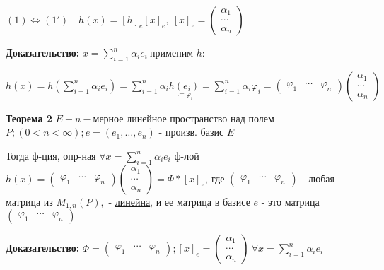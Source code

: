 $(1) \Leftrightarrow (1') \quad h(x) = [h]_e [x]_e,\ [x]_e = \begin{pmatrix} \alpha_1  \\ \cdots \\ \alpha_n \end{pmatrix}$

\textbf{Доказательство: } $x = \sum\limits_{i=1}^n \alpha_i e_i \ $применим $h:$

$h(x) = h\left( \sum\limits_{i=1}^n \alpha_i e_i \right) = \sum\limits_{i=1}^n \alpha_i \underset{:=\varphi_i}{h(e_i)} = \sum\limits_{i=1}^n \alpha_i \varphi_i = \begin{pmatrix} \varphi_1 & \cdots & \varphi_n \end{pmatrix} \begin{pmatrix} \alpha_1 \\ \cdots \\ \alpha_n \end{pmatrix}$

\textbf{Теорема 2} $E - n-$мерное линейное пространство над полем $P; (0 < n < \infty); e=(e_1, \ldots, e_n)$ - произв. базис $E$

Тогда ф-ция, опр-ная $\forall x = \sum\limits_{i=1}^n \alpha_i e_i$ ф-лой $h(x) = \begin{pmatrix} \varphi_1 & \cdots & \varphi_n \end{pmatrix} \begin{pmatrix} \alpha_1 \\ \cdots \\ \alpha_n \end{pmatrix} = \Phi*[x]_e,\ $где $\begin{pmatrix} \varphi_1 & \cdots & \varphi_n \end{pmatrix}$ - любая матрица из $M_{1,n}(P),$ - 
\underline{линейна}, и ее матрица в базисе $e$ - это матрица $\begin{pmatrix} \varphi_1 & \cdots & \varphi_n \end{pmatrix}$

\textbf{Доказательство:} $\Phi = \begin{pmatrix} \varphi_1 & \cdots & \varphi_n \end{pmatrix}; [x]_e = \begin{pmatrix} \alpha_1 \\ \cdots \\ \alpha_n \end{pmatrix}\ \forall x = \sum\limits_{i=1}^n \alpha_i e_i $

